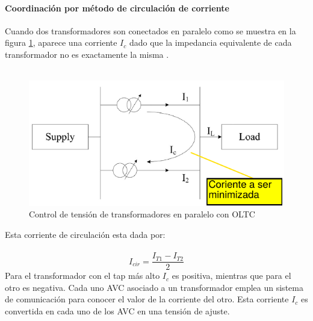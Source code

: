 \documentclass[12pt, letterpaper]{report}
\begin{document}
\paragraph{Coordinación por método de circulación de corriente} 
Cuando dos transformadores son conectados en paralelo como se muestra en la figura \ref{fig:paralelo}, aparece una  corriente $I_{c}$ dado que la impedancia equivalente de cada transformador no es exactamente la misma \cite{Fila2007}.\\\\
\begin{figure}[h]
\centering
\caption{Control de tensión de transformadores en paralelo con OLTC}
\label{fig:paralelo}
\includegraphics[width=0.7\linewidth]{imagenes/cap_2/paralelo}
\end{figure}
Esta corriente  de circulación esta dada por:\\\\
\begin{equation}
  \label{eq:icir}
I_{cir} = \dfrac{I_{T1} - I_{T2}}{2} 
\end{equation}
Para el transformador con el tap más alto $I_{c}$ es positiva, mientras que para el  otro es negativa. Cada uno AVC asociado a un transformador emplea un sistema de comunicación para conocer el valor de la corriente del otro. Esta corriente $I_{c}$ es convertida en cada uno de los AVC en una tensión de ajuste.
\end{document}
